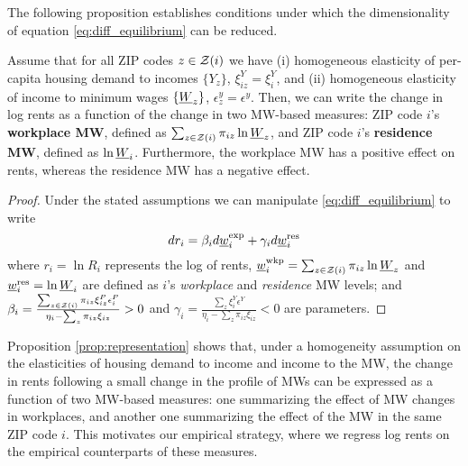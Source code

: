 The following proposition establishes conditions under which the dimensionality
of equation \eqref{eq:diff_equilibrium} can be reduced.

\begin{prop}[Representation]\label{prop:representation}
    Assume that for all ZIP codes $z\in\mathcal{Z}(i)$ we have
    (i) homogeneous elasticity of per-capita housing demand to incomes $\{Y_z\}$,
    $\xi^Y_{iz}=\xi^Y_{i}$, and
    (ii) homogeneous elasticity of income to minimum wages $\{\underline{W}_z\}$,
    $\epsilon_z^y=\epsilon^y$.
    Then, we can write the change in log rents as a function of the change in 
    two MW-based measures: ZIP code $i$'s \textbf{workplace MW}, defined
    as $\sum_{z\in\mathcal{Z}(i)} \pi_{iz} \ln \underline{W}_z$, and 
    ZIP code $i$'s \textbf{residence MW}, defined as $\ln\underline{W}_i$.
    Furthermore, the workplace MW has a positive effect on rents, whereas the
    residence MW has a negative effect.
\end{prop}
\begin{proof}
    Under the stated assumptions we can manipulate \eqref{eq:diff_equilibrium} 
    to write
    \begin{equation} \label{eq:theory_representation}
        d r_i = \beta_i  d \underline{w}^{\text{exp}}_i
              + \gamma_i d \underline{w}^{\text{res}}_i
    \end{equation}
    where
    $r_i=\ln R_i$ represents the log of rents,
    $\underline{w}^{\text{wkp}}_i = \sum_{z\in\mathcal{Z}(i)} \pi_{iz} \ln \underline{W}_z$ and
    $\underline{w}^{\text{res}}_i = \ln \underline{W}_i$ are defined as $i$'s 
    \textit{workplace} and \textit{residence} MW levels; and
    $\beta_i = \frac{\sum_{z\in\mathcal{Z}(i)}\pi_{iz}\xi_{iz}^{P}\epsilon_{i}^{P}}
                    {\eta_{i} - \sum_z \pi_{iz} \xi_{iz}} 
             >0$ and
    $\gamma_i = \frac{\sum_z \xi_{i}^{Y}\epsilon^{Y}}
                     {\eta_{i} - \sum_z \pi_{iz} \xi_{iz}} 
              < 0$
    are parameters.
\end{proof}

Proposition \ref{prop:representation} shows that, under a homogeneity assumption
on the elasticities of housing demand to income and income to the MW,
the change in rents following a small change in the profile of MWs can be 
expressed as a function of two MW-based measures:
one summarizing the effect of MW changes in workplaces,
and another one summarizing the effect of the MW in the same ZIP code $i$.
This motivates our empirical strategy, where we regress log rents on the empirical
counterparts of these measures.

